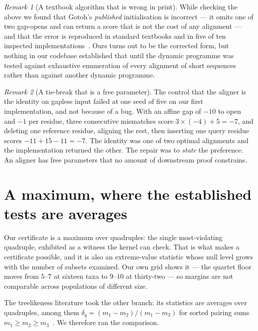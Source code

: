 \documentclass[11pt,a4paper]{article}
\theoremstyle{definition}
\theoremstyle{remark}
\newtheorem{remark}{Remark}[section]
\begin{document}
\begin{remark}[A textbook algorithm that is wrong in print]
While checking the above we found that Gotoh's \emph{published} initialisation is
incorrect --- it omits one of two gap-opens and can return a score that is not
the cost of any alignment --- and that the error is reproduced in standard
textbooks and in five of ten inspected implementations~\cite{flouri}. Ours turns
out to be the corrected form, but nothing in our codebase established that until
the dynamic programme was tested against exhaustive enumeration of every
alignment of short sequences rather than against another dynamic programme.
\end{remark}

\begin{remark}[A tie-break that is a free parameter]
The control that the aligner is the identity on gapless input failed at one seed
of five on our first implementation, and not because of a bug. With an affine gap
of $-10$ to open and $-1$ per residue, three consecutive mismatches score
$3 \times (-4) + 5 = -7$, and deleting one reference residue, aligning the rest,
then inserting one query residue scores $-11 + 15 - 11 = -7$. The identity was
one of two optimal alignments and the implementation returned the other. The
repair was to \emph{state} the preference. An aligner has free parameters that no
amount of downstream proof constrains.
\end{remark}

\section{A maximum, where the established tests are averages}\label{sec:maxmean}

Our certificate is a maximum over quadruples: the single most-violating
quadruple, exhibited as a witness the kernel can check. That is what makes a
certificate possible, and it is also an extreme-value statistic whose null level
grows with the number of subsets examined. Our own grid shows it --- the quartet
floor moves from $5$--$7$ at sixteen taxa to $9$--$10$ at thirty-two --- so
margins are not comparable across populations of different size.

The treelikeness literature took the other branch: its statistics are averages
over quadruples, among them $\delta_q = (m_1-m_2)/(m_1-m_3)$ for sorted pairing
sums $m_1 \ge m_2 \ge m_3$~\cite{deltaplots}. We therefore ran the comparison.
\end{document}

